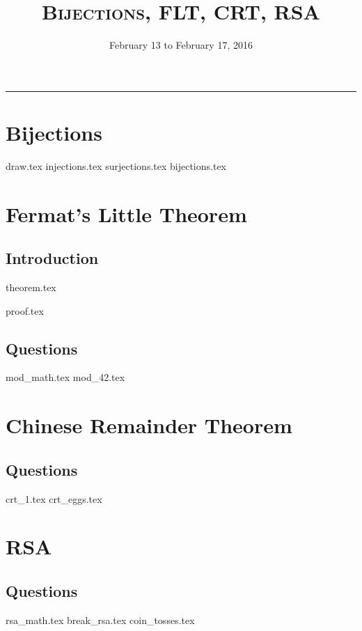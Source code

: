 \documentclass{exam}
\title{\textsc{Bijections, FLT, CRT, RSA}}
\date{February 13 to February 17, 2016}
\begin{document}
\maketitle
\rule{\textwidth}{0.15em}
\fontsize{12}{15}\selectfont
\thispagestyle{empty}

\section{Bijections}
\begin{questions}
	{draw.tex}
	{injections.tex}
	{surjections.tex}
	{bijections.tex}
\end{questions}

\section{Fermat's Little Theorem}
\subsection{Introduction}
{theorem.tex}
\begin{questions}
{proof.tex}
\end{questions}
\subsection{Questions}
\begin{questions}
{mod_math.tex}
{mod_42.tex}
\end{questions}


\section{Chinese Remainder Theorem}
\subsection{Questions}
\begin{questions}
{crt_1.tex}
{crt_eggs.tex}
\end{questions}

\section{RSA}
\subsection{Questions}
\begin{questions}
{rsa_math.tex}
{break_rsa.tex}
{coin_tosses.tex}
\end{questions}
\end{document}
